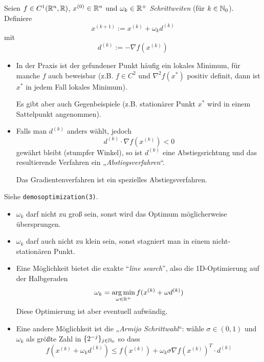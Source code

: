 \documentclass[
]{mycourse}
\begin{document}
\begin{df}[Gradientenverfahren] \label{4.6}
	Seien $f \in C^1(\mathbb{R}^n, \mathbb{R})$, $x^{(0)} \in \mathbb{R}^n$ und $\omega_k \in \mathbb{R}^+$ \emph{Schrittweiten} (für $k \in \mathbb{N}_0$).
	Definiere
	\[
		x^{(k+1)} := x^{(k)} + \omega_k d^{(k)}
	\]
	mit
	\[
		d^{(k)} := - \nabla f(x^{(k)})
	\]
	\begin{note}[Optimalität]
		\begin{itemize}
			\item
				In der Praxis ist der gefundener Punkt häufig ein lokales Minimum, für manche $f$ auch beweisbar (z.B. $f \in C^2$ und $\nabla^2 f(x^*)$ positiv definit, dann ist $x^*$ in jedem Fall lokales Minimum).

				Es gibt aber auch Gegenbeispiele (z.B. stationärer Punkt $x^*$ wird in einem Sattelpunkt angenommen).
		\end{itemize}
	\end{note}
	\begin{note}[Abstiegsrichtung]
		\begin{itemize}
			\item
				Falls man $d^{(k)}$ anders wählt, jedoch
				\[
					d^{(k)} \cdot \nabla f(x^{(k)}) < 0
				\]
				gewährt bleibt (stumpfer Winkel), so ist $d^{(k)}$ eine Abstiegsrichtung und das resultierende Verfahren ein „\emph{Abstiegsverfahren}“.
				
				Das Gradientenverfahren ist ein spezielles Abstiegsverfahren.
		\end{itemize}
	\end{note}
	\begin{note}[Schrittweite]
		Siehe \texttt{demos\textunderscore optimization(3)}.
		\begin{itemize}
			\item
				$\omega_k$ darf nicht zu groß sein, sonst wird das Optimum möglicherweise übersprungen.
			\item
				$\omega_k$ darf auch nicht zu klein sein, sonst stagniert man in einem nicht-stationären Punkt.
			\item
				Eine Möglichkeit bietet die exakte “\emph{line search}”, also die 1D-Optimierung auf der Halbgeraden
				\[
					\omega_k = \argmin_{\omega \in \R^+} f(x^{(k)} + \omega d^{(k)})
				\]
				Diese Optimierung ist aber eventuell aufwändig.
			\item
				Eine andere Möglichkeit ist die „\emph{Armijo Schrittwahl}“: wähle $\sigma \in (0,1)$ und $\omega_k$ als größte Zahl in $\{2^{-j}\}_{j\in \mathbb{N}_0}$ so dass
				\[
					f(x^{(k)} + \omega_k d^{(k)}) \le f(x^{(k)}) + \omega_k \sigma \nabla f(x^{(k)})^T \cdot d^{(k)}
				\]
		\end{itemize}
	\end{note}
\end{df}
\end{document}
